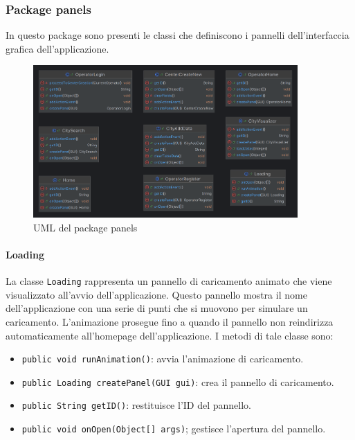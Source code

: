 \subsubsection {Package panels}
In questo package sono presenti le classi che definiscono i pannelli dell'interfaccia grafica dell'applicazione.

\begin{figure}[H]
    \centering
    \includegraphics[width=0.9\textwidth]{img/panelsPackage.png}
    \caption{UML del package panels}
    \label{fig:UMLPanels}    
\end{figure}

\paragraph{Loading}
La classe \texttt{Loading} rappresenta un pannello di caricamento animato che viene visualizzato all'avvio dell'applicazione.
Questo pannello mostra il nome dell'applicazione con una serie di punti che si muovono per simulare un caricamento. 
L'animazione prosegue fino a quando il pannello non reindirizza automaticamente all'homepage dell'applicazione.
I metodi di tale classe sono:
\begin{itemize}
    \item \texttt{public void runAnimation()}: avvia l'animazione di caricamento.
    \item \texttt{public Loading createPanel(GUI gui)}: crea il pannello di caricamento.
    \item \texttt{public String getID()}: restituisce l'ID del pannello.
    \item \texttt{public void onOpen(Object[] args)}; gestisce l'apertura del pannello.
\end{itemize}

